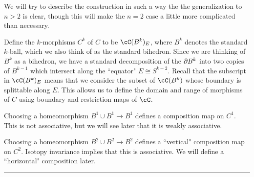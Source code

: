 We will try to describe the construction in such a way the the generalization to $n>2$ is clear,
though this will make the $n=2$ case a little more complicated than necessary.

Define the $k$-morphisms $C^k$ of $C$ to be $\cC(B^k)_E$, where $B^k$ denotes the standard
$k$-ball, which we also think of as the standard bihedron.
Since we are thinking of $B^k$ as a bihedron, we have a standard decomposition of the $\partial B^k$
into two copies of $B^{k-1}$ which intersect along the ``equator" $E \cong S^{k-2}$.
Recall that the subscript in $\cC(B^k)_E$ means that we consider the subset of $\cC(B^k)$
whose boundary is splittable along $E$.
This allows us to define the domain and range of morphisms of $C$ using
boundary and restriction maps of $\cC$.

Choosing a homeomorphism $B^1\cup B^1 \to B^1$ defines a composition map on $C^1$.
This is not associative, but we will see later that it is weakly associative.

Choosing a homeomorphism $B^2\cup B^2 \to B^2$ defines a ``vertical" composition map on $C^2$.
Isotopy invariance implies that this is associative.
We will define a ``horizontal" composition later.






\medskip
\hrule
\medskip

\medskip
